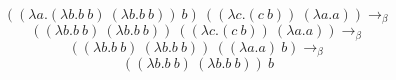 \documentclass{article}
\begin{document}
\LARGE$$((\lambda a.(\lambda b.b\ b)\ (\lambda b.b\ b))\ b)\ ((\lambda c.(c\ b))\ (\lambda a.a))
\rightarrow_\beta$$
$$((\lambda b.b\ b)\ (\lambda b.b\ b))\ ((\lambda c.(c\ b))\ (\lambda a.a))\rightarrow_\beta$$
$$((\lambda b.b\ b)\ (\lambda b.b\ b))\ ((\lambda a.a)\ b)\rightarrow_\beta$$
$$((\lambda b.b\ b)\ (\lambda b.b\ b))\ b$$
\end{document}
